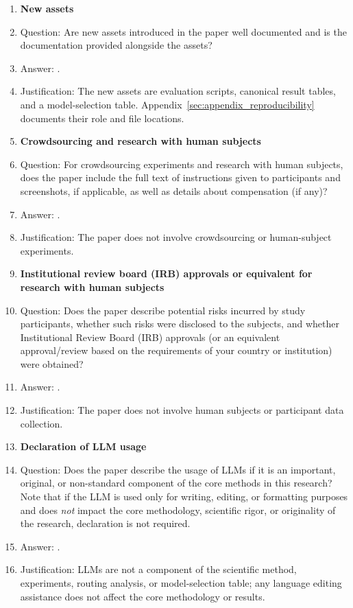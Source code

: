 \begin{enumerate}
\newpage
\item {\bf New assets}
    \item[] Question: Are new assets introduced in the paper well documented and is the documentation provided alongside the assets?
    \item[] Answer: \answerYes{}.
    \item[] Justification: The new assets are evaluation scripts, canonical result tables, and a model-selection table. Appendix~\ref{sec:appendix_reproducibility} documents their role and file locations.

\item {\bf Crowdsourcing and research with human subjects}
    \item[] Question: For crowdsourcing experiments and research with human subjects, does the paper include the full text of instructions given to participants and screenshots, if applicable, as well as details about compensation (if any)?
    \item[] Answer: \answerNA{}.
    \item[] Justification: The paper does not involve crowdsourcing or human-subject experiments.

\item {\bf Institutional review board (IRB) approvals or equivalent for research with human subjects}
    \item[] Question: Does the paper describe potential risks incurred by study participants, whether such risks were disclosed to the subjects, and whether Institutional Review Board (IRB) approvals (or an equivalent approval/review based on the requirements of your country or institution) were obtained?
    \item[] Answer: \answerNA{}.
    \item[] Justification: The paper does not involve human subjects or participant data collection.

\item {\bf Declaration of LLM usage}
    \item[] Question: Does the paper describe the usage of LLMs if it is an important, original, or non-standard component of the core methods in this research? Note that if the LLM is used only for writing, editing, or formatting purposes and does \emph{not} impact the core methodology, scientific rigor, or originality of the research, declaration is not required.
    \item[] Answer: \answerNA{}.
    \item[] Justification: LLMs are not a component of the scientific method, experiments, routing analysis, or model-selection table; any language editing assistance does not affect the core methodology or results.

\end{enumerate}
